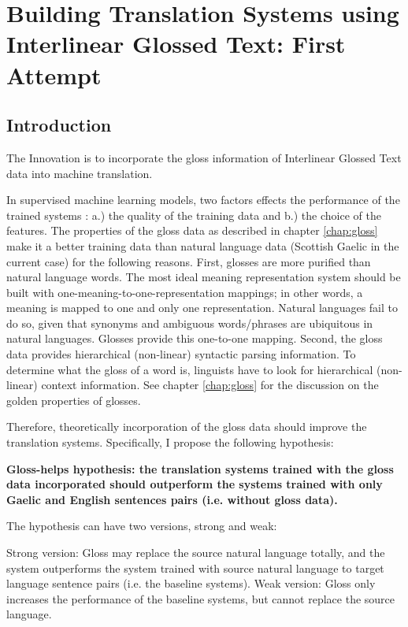 \documentclass[final]{ua-thesis}
\numberwithin{equation}{section}
\begin{document}
\chapter{Building Translation Systems using Interlinear Glossed Text: First Attempt}
\label{chap:cake}


\section{Introduction}
The Innovation is to incorporate the gloss information of Interlinear Glossed Text data into machine translation.

In supervised machine learning models, two factors effects the performance of the trained systems \citep{kotsiantis2007supervised}: a.) the quality of the training data and b.) the choice of the features. The properties of the gloss data as described in chapter \ref{chap:gloss} make it a better training data than natural language data (Scottish Gaelic in the current case) for the following reasons. First, glosses are more purified than natural language words. The most ideal meaning representation system should be built with one-meaning-to-one-representation mappings; in other words, a meaning is mapped to one and only one representation. Natural languages fail to do so, given that synonyms and ambiguous words/phrases are ubiquitous in natural languages. Glosses provide this one-to-one mapping. Second, the gloss data provides hierarchical (non-linear) syntactic parsing information. To determine what the gloss of a word is, linguists have to look for hierarchical (non-linear) context information. See chapter \ref{chap:gloss} for the discussion on the golden properties of glosses.  

Therefore, theoretically incorporation of the gloss data should improve the translation systems. Specifically, I propose the following hypothesis:
\begin{exe} 
\ex \label{gloss_helps_hypothesis}\textbf{Gloss-helps hypothesis: the translation systems trained with the gloss data incorporated should outperform the systems trained with only Gaelic and English sentences pairs (i.e. without gloss data).}

The hypothesis can have two versions, strong and weak:
	\begin{xlist}
	\ex \label{strong_hy} Strong version: Gloss may replace the source natural language totally, and the system outperforms the system trained with source natural language to target language sentence pairs (i.e. the baseline systems).  
	\ex \label{weak_hy} Weak version: Gloss only increases the performance of the baseline systems, but cannot replace the source language.
	\end{xlist}
\end{exe}
\end{document}
